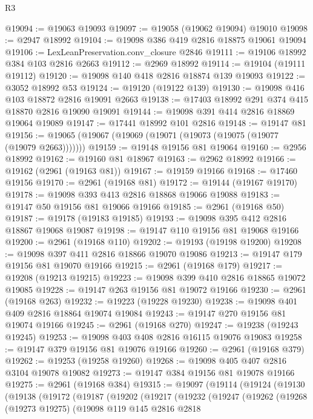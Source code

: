 \begin{lexlean}{R3}
\begin{coremodule}
@19094 := @19063 @19093
@19097 := @19058 (@19062 @19094) @19010
@19098 := @2947 @18992
@19104 := @19098 @386 @419 @2816 @18875 @19061 @19094
@19106 := LexLeanPreservation.conv_closure @2846
@19111 := @19106 @18992 @384 @103 @2816 @2663
@19112 := @2969 @18992
@19114 := @19104 (@19111 @19112)
@19120 := @19098 @140 @418 @2816 @18874 @139 @19093
@19122 := @3052 @18992 @53
@19124 := @19120 (@19122 @139)
@19130 := @19098 @416 @103 @18872 @2816 @19091 @2663
@19138 := @17403 @18992 @291 @374 @415 @18870 @2816 @19090 @19091
@19144 := @19098 @391 @414 @2816 @18869 @19064 @19089
@19147 := @17441 @18992 @101 @2816
@19148 := @19147 @81
@19156 := @19065 (@19067 (@19069 (@19071 (@19073 (@19075 (@19077 (@19079 @2663)))))))
@19159 := @19148 @19156 @81 @19064
@19160 := @2956 @18992
@19162 := @19160 @81 @18967
@19163 := @2962 @18992
@19166 := @19162 (@2961 (@19163 @81))
@19167 := @19159 @19166
@19168 := @17460 @19156
@19170 := @2961 (@19168 @81)
@19172 := @19144 (@19167 @19170)
@19178 := @19098 @393 @413 @2816 @18868 @19066 @19088
@19183 := @19147 @50 @19156 @81 @19066 @19166
@19185 := @2961 (@19168 @50)
@19187 := @19178 (@19183 @19185)
@19193 := @19098 @395 @412 @2816 @18867 @19068 @19087
@19198 := @19147 @110 @19156 @81 @19068 @19166
@19200 := @2961 (@19168 @110)
@19202 := @19193 (@19198 @19200)
@19208 := @19098 @397 @411 @2816 @18866 @19070 @19086
@19213 := @19147 @179 @19156 @81 @19070 @19166
@19215 := @2961 (@19168 @179)
@19217 := @19208 (@19213 @19215)
@19223 := @19098 @399 @410 @2816 @18865 @19072 @19085
@19228 := @19147 @263 @19156 @81 @19072 @19166
@19230 := @2961 (@19168 @263)
@19232 := @19223 (@19228 @19230)
@19238 := @19098 @401 @409 @2816 @18864 @19074 @19084
@19243 := @19147 @270 @19156 @81 @19074 @19166
@19245 := @2961 (@19168 @270)
@19247 := @19238 (@19243 @19245)
@19253 := @19098 @403 @408 @2816 @16115 @19076 @19083
@19258 := @19147 @379 @19156 @81 @19076 @19166
@19260 := @2961 (@19168 @379)
@19262 := @19253 (@19258 @19260)
@19268 := @19098 @405 @407 @2816 @3104 @19078 @19082
@19273 := @19147 @384 @19156 @81 @19078 @19166
@19275 := @2961 (@19168 @384)
@19315 := @19097
    (@19114
      (@19124
        (@19130
          (@19138
            (@19172
              (@19187
                (@19202
                  (@19217
                    (@19232
                      (@19247
                        (@19262
                          (@19268
                            (@19273 @19275)
                            (@19098
                              @119
                              @145
                              @2816
                              @2818

\end{coremodule}
\end{lexlean}
